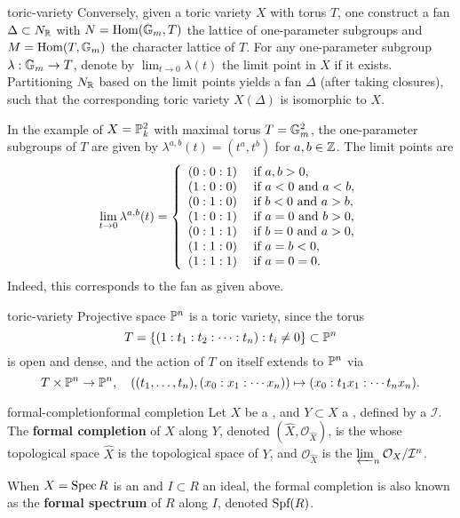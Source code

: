 \begin{example}{toric-variety}
    Conversely, given a toric variety $X$ with torus $T$, one construct a fan $\Delta \subset N_{\mathbb{R}}$ with $N = \operatorname{Hom}(\mathbb{G}_m, T)$ the lattice of one-parameter subgroups and $M = \operatorname{Hom}(T, \mathbb{G}_m)$ the character lattice of $T$. For any one-parameter subgroup $\lambda : \mathbb{G}_m \to T$, denote by $\lim_{t \to 0} \lambda(t)$ the limit point in $X$ if it exists. Partitioning $N_{\mathbb{R}}$ based on the limit points yields a fan $\Delta$ (after taking closures), such that the corresponding toric variety $X(\Delta)$ is isomorphic to $X$.

    In the example of $X = \mathbb{P}^2_k$ with maximal torus $T = \mathbb{G}_m^2$, the one-parameter subgroups of $T$ are given by $\lambda^{a, b}(t) = (t^a, t^b)$ for $a, b \in \mathbb{Z}$. The limit points are
    \[ \lim_{t \to 0} \lambda^{a, b}(t) = \left\{ \begin{array}{cl}
        (0 : 0 : 1) & \textup{ if } a, b > 0, \\
        (1 : 0 : 0) & \textup{ if } a < 0 \textup{ and } a < b, \\
        (0 : 1 : 0) & \textup{ if } b < 0 \textup{ and } a > b, \\
        (1 : 0 : 1) & \textup{ if } a = 0 \textup{ and } b > 0, \\
        (0 : 1 : 1) & \textup{ if } b = 0 \textup{ and } a > 0, \\
        (1 : 1 : 0) & \textup{ if } a = b < 0, \\
        (1 : 1 : 1) & \textup{ if } a = 0 = 0.
    \end{array} \right. \]
    Indeed, this corresponds to the fan as given above.
\end{example}

\begin{example}{toric-variety}
    Projective space $\mathbb{P}^n$ is a toric variety, since the torus
    \[ T = \{ (1 : t_1 : t_2 : \cdots : t_n) : t_i \ne 0 \} \subset \mathbb{P}^n \]
    is open and dense, and the action of $T$ on itself extends to $\mathbb{P}^n$ via
    \[ T \times \mathbb{P}^n \to \mathbb{P}^n, \quad \left( (t_1, \ldots, t_n), (x_0 : x_1 : \cdots x_n) \right) \mapsto (x_0 : t_1 x_1 : \cdots t_n x_n) . \]
\end{example}

\begin{topic}{formal-completion}{formal completion}
    Let $X$ be a  , and $Y \subset X$ a , defined by a  $\mathcal{I}$. The \textbf{formal completion} of $X$ along $Y$, denoted $(\hat{X}, \mathcal{O}_{\hat{X}})$, is the  whose topological space $\hat{X}$ is the topological space of $Y$, and $\mathcal{O}_{\hat{X}}$ is the  $\varprojlim_n \mathcal{O}_X / \mathcal{I}^n$.
    
    When $X = \operatorname{Spec} R$ is an  and $I \subset R$ an ideal, the formal completion is also known as the \textbf{formal spectrum} of $R$ along $I$, denoted $\textup{Spf}(R)$.
\end{topic}

